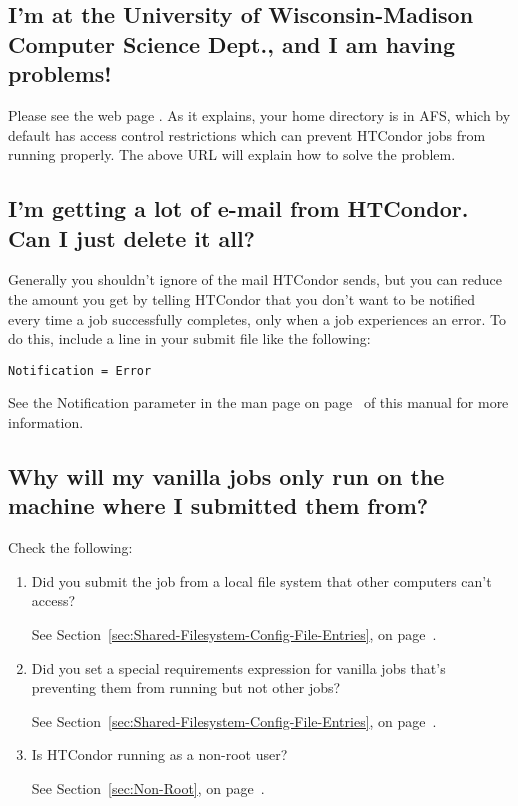 \subsection*{I'm at the University of Wisconsin-Madison Computer Science Dept., and I am having problems!}

Please see the web page .
As
it explains, your home directory is in AFS, which by default has
access control restrictions which can prevent HTCondor jobs from running
properly.
The above URL will explain how to solve the problem.

\subsection*{I'm getting a lot of e-mail from HTCondor.  Can I just delete it all?}

Generally you shouldn't ignore  of the mail HTCondor sends,
but you can reduce the amount you get by telling HTCondor that you don't
want to be notified every time a job successfully completes, only when
a job experiences an error.
To do this, include a line in your submit file like the following:

\begin{verbatim}
Notification = Error
\end{verbatim}

See the Notification parameter in the  man page on
page~\pageref{man-condor-submit-notification} of this manual for more
information.

\subsection*{Why will my vanilla jobs only run on the machine where I submitted them from?}

Check the following:
\begin {enumerate}

\item{Did you submit the job from a local file system that other
computers can't access?}

See Section~\ref{sec:Shared-Filesystem-Config-File-Entries}, on
page~\pageref{sec:Shared-Filesystem-Config-File-Entries}.

\item{Did you set a special requirements expression for 
vanilla jobs that's preventing them from running but not other jobs?}

See Section~\ref{sec:Shared-Filesystem-Config-File-Entries}, on
page~\pageref{sec:Shared-Filesystem-Config-File-Entries}.

\item{Is HTCondor running as a non-root user?}

See Section~\ref{sec:Non-Root}, on page~\pageref{sec:Non-Root}.

\end{enumerate}

